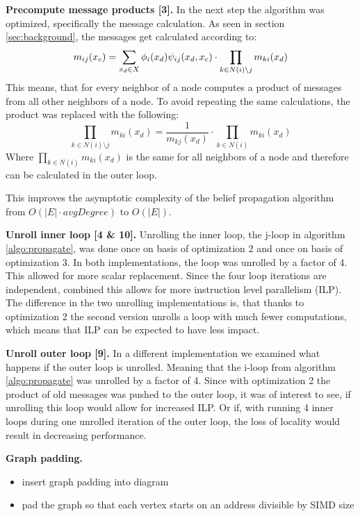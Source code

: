 \documentclass[letterpaper]{article}
\newcommand{\mypar}[1]{{\bf #1.}}
\begin{document}
\mypar{Precompute message products [3]}
In the next step the algorithm was optimized, specifically the message calculation. As seen in section \ref{sec:background}, the messages get calculated according to:
$$m_{ij}(x_c) = \sum_{x_d \in X} \phi_i(x_d)\psi_{ij}(x_d, x_c) \cdot \prod_{k \in N(i) \setminus j} m_{ki}(x_d)$$
This means, that for every neighbor of a node computes a product of messages from all other neighbors of a node. To avoid repeating the same calculations, the product was replaced with the following:
$$\prod_{k \in N(i) \setminus j} m_{ki}(x_d) = \frac{1}{m_{kj}(x_d)} \cdot \prod_{k \in N(i)} m_{ki}(x_d)$$
Where $\prod_{k \in N(i)} m_{ki}(x_d)$ is the same for all neighbors of a node and therefore can be calculated in the outer loop. 

This improves the asymptotic complexity of the belief propagation algorithm from $O(|E|\cdot avgDegree)$ to $O(|E|)$.

\mypar{Unroll inner loop [4 \& 10]}
Unrolling the inner loop, the j-loop in algorithm \ref{algo:propagate}, was done once on basis of optimization 2 and once on basis of optimization 3. In both implementations, the loop was unrolled by a factor of 4. This allowed for more scalar replacement. Since the four loop iterations are independent, combined this allows for more instruction level parallelism (ILP).
The difference in the two unrolling implementations is, that thanks to optimization 2 the second version unrolls a loop with much fewer computations, which means that ILP can be expected to have less impact.


\mypar{Unroll outer loop [9]}
In a different implementation we examined what happens if the outer loop is unrolled. Meaning that the i-loop from algorithm \ref{algo:propagate} was unrolled by a factor of 4. Since with optimization 2 the product of old messages was pushed to the outer loop, it was of interest to see, if unrolling this loop would allow for increased ILP. Or if, with running 4 inner loops during one unrolled iteration of the outer loop, the loss of locality would result in decreasing performance.

\mypar{Graph padding}
\begin{itemize}
\item insert graph padding into diagram
\item pad the graph so that each vertex starts on an address divisible by SIMD size
\end{itemize}
\end{document}
